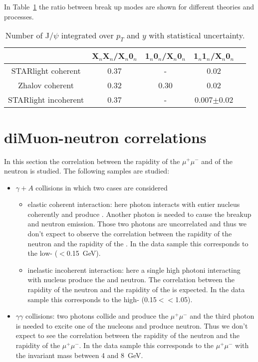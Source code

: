     In Table~\ref{tab:r3} the ratio between break up modes are shown for 
      different theories and processes.
    \begin{table}[h]
      \begin{center}
        \begin{tabular}{|c|c|c|c|c|}
          \hline
          & X$_{n}$X$_{n}$/X$_{n}$0$_{n}$ & 1$_{n}$0$_{n}$/X$_{n}$0$_{n}$ & 1$_{n}$1$_{n}$/X$_{n}$0$_{n}$  \\ \hline
          STARlight coherent &  0.37&-&0.02\\ \hline
          Zhalov coherent& 0.32&0.30&0.02\\ \hline
          STARlight incoherent &  0.37&-&0.007$\pm$0.02 \\ \hline
        \end{tabular}
        \caption{\label{tab:r3} Number of  J/$\psi$ integrated over $p_{T}$ and $y$ with 
          statistical uncertainty.}
      \end{center}
    \end{table}

  \section{diMuon-neutron correlations}
    In this section the correlation between the rapidity of the $\mu^{+}\mu^{-}$ 
      and of the neutron is studied. The following samples are studied: 
    \begin{itemize}
      \item $\gamma + A$ collisions in which two cases are considered
      \begin{itemize}
        \item elastic coherent interaction: here photon interacts with entier
          nucleus coherently and produce \JPsi. 
          Another photon is needed to cause the breakup and neutron emission. 
          Those two photons are uncorrelated and thus we don't expect to 
            observe the correlation between the rapidity of the neutron and the
            rapidity of the \JPsi.
          In the data sample this corresponds to the low-\pt \JPsi 
            (\pt$<$0.15~GeV). 
        \item inelastic incoherent interaction: here a single high \pt photoni
          interacting with nucleus produce the \JPsi and neutron. 
          The correlation between the rapidity of the neutron and the rapidity
            of the \JPsi is expected.
          In the data sample this corresponds to the high-\pt \JPsi 
            (0.15$<$\pt$<$1.05). 
      \end{itemize}
      \item $\gamma \gamma$ collisions: two photons collide and produce the 
        $\mu^{+}\mu^{-}$  and the third photon is needed to excite one of
          the nucleons and produce neutron. 
        Thus we don't expect to see the correlation between the rapidity of the
          neutron and the rapidity of the $\mu^{+}\mu^{-}$. 
        In the data sample this corresponds to the $\mu^{+}\mu^{-}$ with the
          invariant mass between 4 and 8~GeV. 
    \end{itemize}

